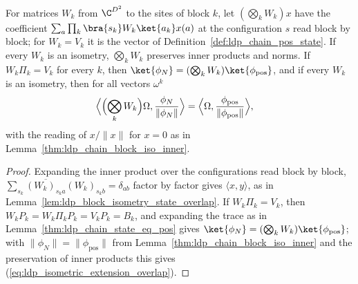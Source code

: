 \begin{lemma}
    \label{thm:ldp_isometric_extension_overlap}
    \leanok
    For matrices $W_k$ from $\C^{D^2}$ to the sites of block $k$, let
    $(\bigotimes_kW_k)x$ have the coefficient $\sum_a\prod_k\bra{s_k}W_k\ket{a_k}x(a)$
    at the configuration $s$ read block by block; for $W_k=V_k$ it is the
    vector of Definition~\ref{def:ldp_chain_pos_state}. If every $W_k$ is an
    isometry, $\bigotimes_kW_k$ preserves inner products and norms. If
    $W_k\Pi_k=V_k$ for every $k$, then
    $\ket{\phi_N}=(\bigotimes_kW_k)\ket{\phi_{\mathrm{pos}}}$, and if
    every $W_k$ is an isometry, then for all vectors $\omega^k$
    \begin{align}
        \Bigl\langle\Bigl(\bigotimes_kW_k\Bigr)\Omega,
        \frac{\phi_N}{\lVert\phi_N\rVert}\Bigr\rangle
         & =\Bigl\langle\Omega,
        \frac{\phi_{\mathrm{pos}}}{\lVert\phi_{\mathrm{pos}}\rVert}\Bigr\rangle,
        \label{eq:ldp_isometric_extension_overlap}
    \end{align}
    with the reading of $x/\lVert x\rVert$ for $x=0$ as in
    Lemma~\ref{thm:ldp_chain_block_iso_inner}.
\end{lemma}
\begin{proof}
    \leanok
    Expanding the inner product over the configurations read block by block,
    $\sum_{s_k}\overline{(W_k)_{s_ka}}(W_k)_{s_kb}=\delta_{ab}$ factor by factor
    gives $\langle x,y\rangle$, as in
    Lemma~\ref{lem:ldp_block_isometry_state_overlap}. If $W_k\Pi_k=V_k$, then
    $W_kP_k=W_k\Pi_kP_k=V_kP_k=B_k$, and expanding the trace as in
    Lemma~\ref{thm:ldp_chain_state_eq_pos} gives
    $\ket{\phi_N}=(\bigotimes_kW_k)\ket{\phi_{\mathrm{pos}}}$; with
    $\lVert\phi_N\rVert=\lVert\phi_{\mathrm{pos}}\rVert$ from
    Lemma~\ref{thm:ldp_chain_block_iso_inner} and the preservation of inner
    products this gives (\ref{eq:ldp_isometric_extension_overlap}).
\end{proof}

